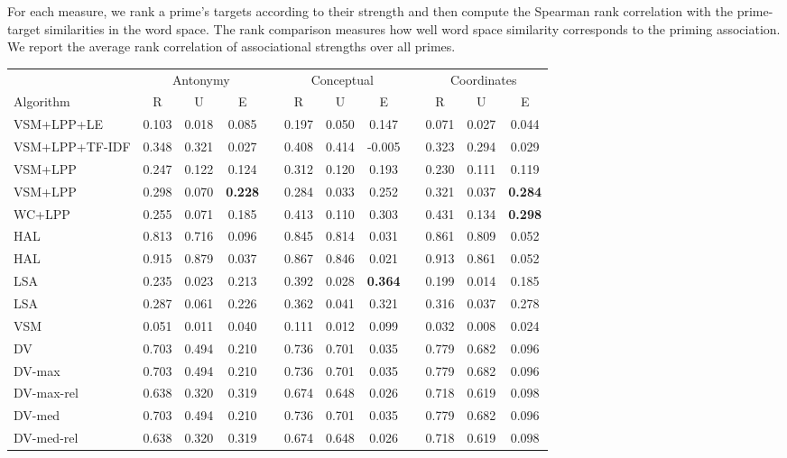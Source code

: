 \documentclass[11pt]{article}
\begin{document}
For each measure, we rank a prime's targets according to their strength and then
compute the Spearman rank correlation with the prime-target similarities in the
word space.  The rank comparison measures how well word space similarity
corresponds to the priming association.  We report the average rank correlation
of associational strengths over all primes.

\begin{table*}[htb]
  \center
  \small
  \begin{threeparttable}
  \begin{tabular}{l ccc r ccc r ccc }
      \toprule
      & 
      \multicolumn{3}{c}{Antonymy} &&
      \multicolumn{3}{c}{Conceptual} &&
      \multicolumn{3}{c}{Coordinates} \\
      \cmidrule{2-4}  \cmidrule{6-8} \cmidrule{10-12}
      Algorithm & R\tnote{b} & U & E && R & U & E && R & U & E \\
      \midrule
      VSM+LPP+LE & 0.103 & 0.018 & 0.085 && 0.197 & 0.050 & 0.147 && 0.071 & 0.027 & 0.044  \\
      VSM+LPP+TF-IDF &
 0.348 & 0.321 & 0.027 && 0.408 & 0.414 & -0.005 && 0.323 & 0.294 & 0.029  \\
      VSM+LPP    &
 0.247 & 0.122 & 0.124 && 0.312 & 0.120 & 0.193 && 0.230 & 0.111 & 0.119  \\
      VSM+LPP\tnote{a}  &
 0.298 & 0.070 & {\bf 0.228} && 0.284 & 0.033 & 0.252 && 0.321 & 0.037 & {\bf
 0.284}  \\
      WC+LPP &
 0.255 & 0.071 & 0.185 && 0.413 & 0.110 & 0.303 && 0.431 & 0.134 & {\bf 0.298}  \\
      HAL & 
 0.813 & 0.716 & 0.096 && 0.845 & 0.814 & 0.031 && 0.861 & 0.809 & 0.052  \\
      HAL\tnote{a} &
 0.915 & 0.879 & 0.037 && 0.867 & 0.846 & 0.021 && 0.913 & 0.861 & 0.052  \\
      LSA &
 0.235 & 0.023 & 0.213 && 0.392 & 0.028 & {\bf 0.364} && 0.199 & 0.014 & 0.185  \\
      LSA\tnote{a} &
 0.287 & 0.061 & 0.226 && 0.362 & 0.041 & 0.321 && 0.316 & 0.037 & 0.278  \\
      VSM &
 0.051 & 0.011 & 0.040 && 0.111 & 0.012 & 0.099 && 0.032 & 0.008 & 0.024  \\

      DV &
0.703 & 0.494 & 0.210  &&  0.736 & 0.701 & 0.035  &&  0.779 & 0.682 & 0.096  \\
      DV-max  &
0.703 & 0.494 & 0.210  &&  0.736 & 0.701 & 0.035  &&  0.779 & 0.682 & 0.096  \\
      DV-max-rel  &
0.638 & 0.320 & 0.319  &&  0.674 & 0.648 & 0.026  &&  0.718 & 0.619 & 0.098  \\
      DV-med &
0.703 & 0.494 & 0.210  &&  0.736 & 0.701 & 0.035  &&  0.779 & 0.682 & 0.096  \\
      DV-med-rel &
0.638 & 0.320 & 0.319  &&  0.674 & 0.648 & 0.026  &&  0.718 & 0.619 & 0.098  \\


\end{tabular}
\end{threeparttable}
\end{table*}
\end{document}

